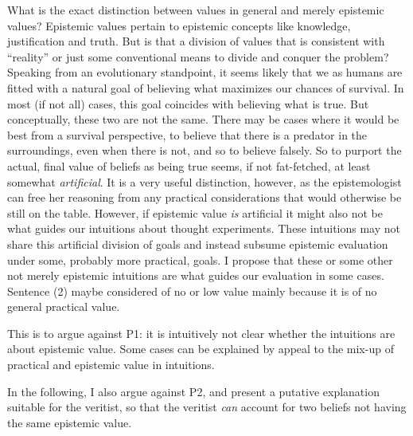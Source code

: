 \documentclass[12pt,numbers=noenddot]{scrartcl}
\begin{document}
What is the exact distinction between values in general and merely epistemic values? Epistemic values pertain to epistemic concepts like knowledge, justification and truth. But is that a division of values that is consistent with “reality” or just some conventional means to divide and conquer the problem? Speaking from an evolutionary standpoint, it seems likely that we as humans are fitted with a natural goal of believing what maximizes our chances of survival. In most (if not all) cases, this goal coincides with believing what is true. But conceptually, these two are not the same. There may be cases where it would be best from a survival perspective, to believe that there is a predator in the surroundings, even when there is not, and so to believe falsely. So to purport the actual, final value of beliefs as being true seems, if not fat-fetched, at least somewhat \emph{artificial}. It is a very useful distinction, however, as the epistemologist can free her reasoning from any practical considerations that would otherwise be still on the table. However, if epistemic value \emph{is} artificial it might also not be what guides our intuitions about thought experiments. These intuitions may not share this artificial division of goals and instead subsume epistemic evaluation under some, probably more practical, goals. I propose that these or some other not merely epistemic intuitions are what guides our evaluation in some cases. Sentence (2) maybe considered of no or low value mainly because it is of no general practical value.

This is to argue against P1: it is intuitively not clear whether the intuitions are about epistemic value. Some cases can be explained by appeal to the mix-up of practical and epistemic value in intuitions.

In the following, I also argue against P2, and present a putative explanation suitable for the veritist, so that the veritist \emph{can} account for two beliefs not having the same epistemic value.
\end{document}
